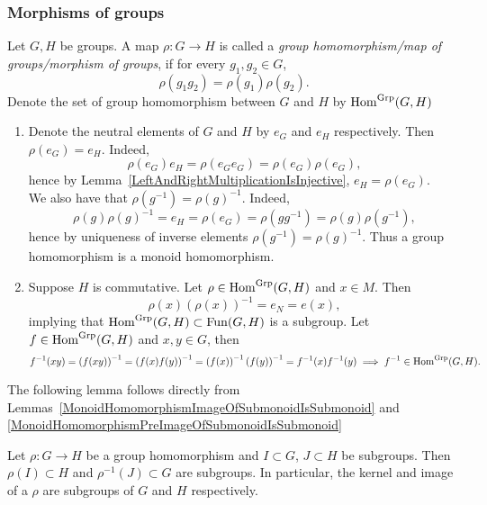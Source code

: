 \subsubsection{Morphisms of groups}
\begin{definition}
    Let $G,H$ be groups. A map $\rho : G\rightarrow H$ is called a \textit{group homomorphism/map of groups/morphism of groups}, if for every $g_1,g_2\in G$,
    $$\rho(g_1g_2)=\rho(g_1)\rho(g_2).$$
    Denote the set of group homomorphism between $G$ and $H$ by $\mathrm{Hom}^\text{Grp}(G,H)$
\end{definition}
\begin{remark}\label{GroupHomomorphismSendsInversesToInversesAndNeutralElementsToNeutralElements}
    \begin{enumerate}
    \item Denote the neutral elements of $G$ and $H$ by $e_G$ and $e_H$ respectively. Then $\rho(e_G)=e_H$. Indeed, 
    $$\rho(e_G)e_H=\rho(e_Ge_G)=\rho(e_G)\rho(e_G),$$
    hence by Lemma~\ref{LeftAndRightMultiplicationIsInjective}, $e_H= \rho(e_G)$.\\ 
    We also have that $\rho\left(g^{-1}\right) = \rho(g)^{-1}$. Indeed,
    $$\rho(g)\rho(g)^{-1} = e_H = \rho(e_G)=\rho\left(gg^{-1}\right)=\rho(g)\rho\left(g^{-1}\right),$$
    hence by uniqueness of inverse elements $\rho\left(g^{-1}\right) = \rho(g)^{-1}$. Thus a group homomorphism is a monoid homomorphism.
    \item Suppose $H$ is commutative. Let $\rho \in \mathrm{Hom}^\text{Grp}(G,H)$ and $x\in M$. Then 
    $$\rho(x)\left(\rho(x)\right)^{-1}=e_N = e(x),$$
    implying that $\mathrm{Hom}^\text{Grp}(G,H)\subset \mathrm{Fun}(G,H)$ is a subgroup. Let $f\in \mathrm{Hom}^\text{Grp}(G,H)$ and $x,y\in G$, then 
    $$f^{-1}(xy) = \left(f(xy)\right)^{-1} = \left(f(x)f(y)\right)^{-1} = \left(f(x)\right)^{-1}\left(f(y)\right)^{-1} = f^{-1}(x)f^{-1}(y) \implies f^{-1}\in \mathrm{Hom}^\text{Grp}(G,H).$$
    \end{enumerate}
\end{remark}
The following lemma follows directly from Lemmas~\ref{MonoidHomomorphismImageOfSubmonoidIsSubmonoid} and \ref{MonoidHomomorphismPreImageOfSubmonoidIsSubmonoid}
\begin{lemma}\label{KernelAndImageOfGroupHomomorphismIsSubgroup}
    Let $\rho : G\rightarrow H$ be a group homomorphism and $I\subset G$, $J\subset H$ be subgroups. Then $\rho(I)\subset H$ and $\rho^{-1}(J)\subset G$ are subgroups. In particular, the kernel and image of a $\rho$ are subgroups of $G$ and $H$ respectively. 
\end{lemma}
